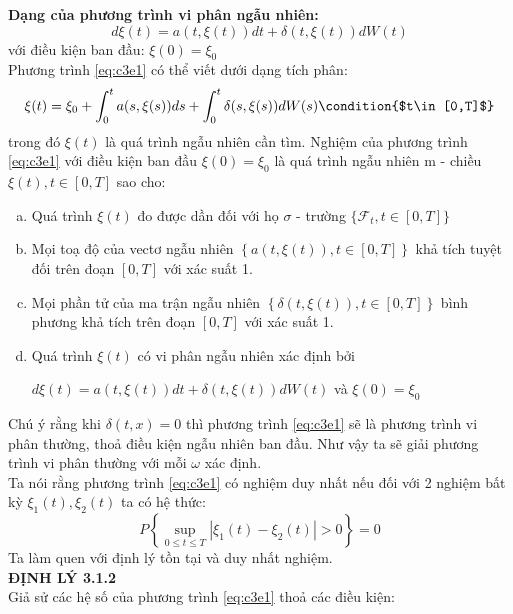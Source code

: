 \documentclass[14pt,a4paper]{article}
\numberwithin{equation}{section}
\begin{document}
\textbf{Dạng của phương trình vi phân ngẫu nhiên:}\\
\begin{equation}\label{eq:c3e1}
	d\xi(t)=a(t,\xi(t))dt+\delta(t,\xi(t))dW(t)
\end{equation}
với điều kiện ban đầu: $\xi(0)=\xi_0$\\
Phương trình \eqref{eq:c3e1} có thể viết dưới dạng tích phân:
\begin{equation*}
	\xi(t)=\xi_0+\int_{0}^{t}a(s,\xi(s))ds+\int_{0}^{t}\delta(s,\xi(s))dW(s) \condition{$t\in[0,T]$}
\end{equation*}
trong đó $\xi(t)$ là quá trình ngẫu nhiên cần tìm. Nghiệm của phương trình \eqref{eq:c3e1} với điều kiện ban đầu $\xi(0)=\xi_0$ là quá trình ngẫu nhiên m - chiều $\xi(t),t\in[0,T]$ sao cho:\\
\begin{enumerate}[a)]
	\item Quá trình $\xi(t)$ đo được dần đối với họ $\sigma$ - trường $\{\mathscr{F}_t,t\in[0,T]\}$
	\item Mọi toạ độ của vectơ ngẫu nhiên $\left\{a(t,\xi(t)),t\in[0,T] \right\}$ khả tích tuyệt đối trên đoạn $[0,T]$ với xác suất 1.
	\item Mọi phần tử của ma trận ngẫu nhiên $\left\{\delta(t,\xi(t)),t\in[0,T] \right\}$ bình phương khả tích trên đoạn $[0,T]$ với xác suất 1.
	\item Quá trình $\xi(t)$ có vi phân ngẫu nhiên xác định bởi 
\begin{center}
	$d\xi(t)=a(t,\xi(t))dt+\delta(t,\xi(t))dW(t)$ và $\xi(0)=\xi_0$
\end{center}
\end{enumerate}
Chú ý rằng khi $\delta(t,x)=0$ thì phương trình \eqref{eq:c3e1} sẽ là phương trình vi phân thường, thoả điều kiện ngẫu nhiên ban đầu. Như vậy ta sẽ giải phương trình vi phân thường với mỗi $\omega$ xác định.\\
Ta nói rằng phương trình \eqref{eq:c3e1} có nghiệm duy nhất nếu đối với 2 nghiệm bất kỳ $\xi_1(t),\xi_2(t)$ ta có hệ thức:\\
\begin{equation*}
	P\left\{\sup_{0\leq t\leq T}|\xi_1(t)-\xi_2(t)|>0 \right\}=0
\end{equation*}
Ta làm quen với định lý tồn tại và duy nhất nghiệm.\\
\textbf{ĐỊNH LÝ 3.1.2}\\
Giả sử các hệ số của phương trình \eqref{eq:c3e1} thoả các điều kiện:
\end{document}
